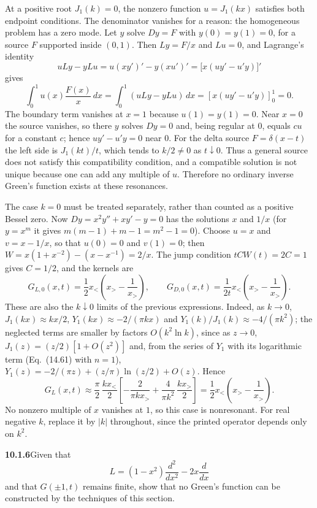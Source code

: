 At a positive root $J_1(k)=0$, the nonzero function $u=J_1(kx)$
satisfies both endpoint conditions. The denominator vanishes for a
reason: the homogeneous problem has a zero mode. Let $y$ solve $Dy=F$
with $y(0)=y(1)=0$, for a source $F$ supported inside $(0,1)$. Then
$Ly=F/x$ and $Lu=0$, and Lagrange's identity
\[
uLy-yLu=u(xy')'-y(xu')'=\bigl[x(uy'-u'y)\bigr]'
\]
gives
\[
\int_0^1u(x)\frac{F(x)}x\,dx
=\int_0^1(uLy-yLu)\,dx
=\left[x(uy'-u'y)\right]_0^1=0.
\]
The boundary term vanishes at $x=1$ because $u(1)=y(1)=0$. Near
$x=0$ the source vanishes, so there $y$ solves $Dy=0$ and, being
regular at $0$, equals $cu$ for a constant $c$; hence $uy'-u'y=0$
near $0$. For the delta source $F=\delta(x-t)$ the left
side is $J_1(kt)/t$, which tends to $k/2\ne0$ as $t\downarrow0$. Thus
a general source does not satisfy this compatibility condition, and a
compatible solution is not unique because one can add any multiple
of $u$. Therefore no ordinary inverse Green's function exists at these
resonances.

The case $k=0$ must be treated separately, rather than counted as a
positive Bessel zero. Now $Dy=x^2y''+xy'-y=0$ has the solutions $x$
and $1/x$ (for $y=x^m$ it gives $m(m-1)+m-1=m^2-1=0$).
Choose $u=x$ and $v=x-1/x$, so that $u(0)=0$ and $v(1)=0$; then
$W=x(1+x^{-2})-(x-x^{-1})=2/x$. The jump condition $tCW(t)=2C=1$
gives $C=1/2$, and the kernels are
\[
\boxed{G_{L,0}(x,t)=\frac12x_<\left(x_>-\frac1{x_>}\right),
\qquad G_{D,0}(x,t)=\frac1{2t}x_<\left(x_>-\frac1{x_>}\right).}
\]
These are also the $k\downarrow0$ limits of the previous expressions.
Indeed, as $k\to0$, $J_1(kx)\approx kx/2$, $Y_1(kx)\approx-2/(\pi kx)$
and $Y_1(k)/J_1(k)\approx-4/(\pi k^2)$; the neglected terms are smaller
by factors $O(k^2\ln k)$, since as $z\to0$,
$J_1(z)=(z/2)[1+O(z^2)]$ and, from the series of $Y_1$ with its
logarithmic term (Eq.~(14.61) with $n=1$),
$Y_1(z)=-2/(\pi z)+(z/\pi)\ln(z/2)+O(z)$. Hence
\[
G_L(x,t)\approx\frac\pi2\,\frac{kx_<}{2}
\left[-\frac2{\pi kx_>}+\frac4{\pi k^2}\,\frac{kx_>}2\right]
=\frac12x_<\left(x_>-\frac1{x_>}\right).
\]
No nonzero multiple of $x$ vanishes at $1$, so this case is nonresonant.
For real negative $k$, replace it by $|k|$ throughout, since the printed
operator depends only on $k^2$.

\par\bigskip
\noindent\textbf{10.1.6}\quad Given that
\[
L=(1-x^{2})\frac{d^{2}}{dx^{2}}-2x\frac{d}{dx}
\]
and that $G(\pm1,t)$ remains finite, show that no Green's function can be
constructed by the techniques of this section.

